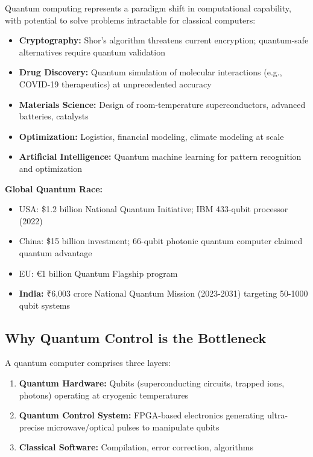 \documentclass[12pt,a4paper]{article}
\begin{document}
Quantum computing represents a paradigm shift in computational capability, with potential to solve problems intractable for classical computers:

\begin{itemize}[leftmargin=*]
    \item \textbf{Cryptography:} Shor's algorithm threatens current encryption; quantum-safe alternatives require quantum validation
    \item \textbf{Drug Discovery:} Quantum simulation of molecular interactions (e.g., COVID-19 therapeutics) at unprecedented accuracy
    \item \textbf{Materials Science:} Design of room-temperature superconductors, advanced batteries, catalysts
    \item \textbf{Optimization:} Logistics, financial modeling, climate modeling at scale
    \item \textbf{Artificial Intelligence:} Quantum machine learning for pattern recognition and optimization
\end{itemize}

\textbf{Global Quantum Race:}
\begin{itemize}[leftmargin=*]
    \item USA: \$1.2 billion National Quantum Initiative; IBM 433-qubit processor (2022)
    \item China: \$15 billion investment; 66-qubit photonic quantum computer claimed quantum advantage
    \item EU: €1 billion Quantum Flagship program
    \item \textbf{India:} ₹6,003 crore National Quantum Mission (2023-2031) targeting 50-1000 qubit systems
\end{itemize}

\subsection{Why Quantum Control is the Bottleneck}

A quantum computer comprises three layers:
\begin{enumerate}
    \item \textbf{Quantum Hardware:} Qubits (superconducting circuits, trapped ions, photons) operating at cryogenic temperatures
    \item \textbf{Quantum Control System:} FPGA-based electronics generating ultra-precise microwave/optical pulses to manipulate qubits
    \item \textbf{Classical Software:} Compilation, error correction, algorithms
\end{enumerate}
\end{document}

